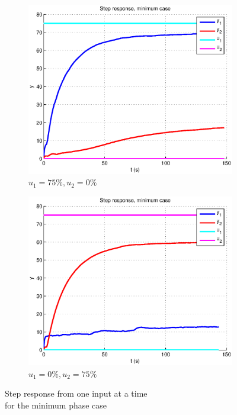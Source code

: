 \begin{figure}[h!t]
        \centering
        \begin{subfigure}[b]{0.45\columnwidth}
                \includegraphics[width=\columnwidth]{fig/steprepmin75_0.eps}
                \caption{$u_1 = 75\%, u_2 = 0\%$}
        \end{subfigure}
        \begin{subfigure}[b]{0.45\columnwidth}
                \includegraphics[width=\columnwidth]{fig/steprepmin0_75.eps}
                \caption{$u_1 = 0\%, u_2 = 75\%$}
        \end{subfigure}
        \caption{Step response from one input at a time \\ for the minimum phase case} 
        \label{steprepmin}
\end{figure}

